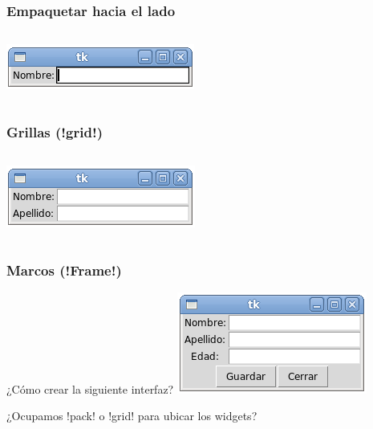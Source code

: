 \documentclass[12pt]{beamer}
\begin{document}
  \begin{frame}
    \label{pack-left}
    \frametitle{Empaquetar hacia el lado}
    \begin{columns}[B]
        \footnotesize
        
        \vspace{24ex}
        \includegraphics[width=\textwidth]{programas/tkinter/capturas/11.png}
    \end{columns}
  \end{frame}

  \begin{frame}
    \label{grillas}
    \frametitle{Grillas (\li!grid!)}
    \begin{columns}[B]
        \footnotesize
        
        \vspace{24ex}
        \includegraphics[width=\textwidth]{programas/tkinter/capturas/12.png}
    \end{columns}
  \end{frame}

  \begin{frame}
    \label{ejemplo-marcos}
    \frametitle{Marcos (\li!Frame!)}
    ¿Cómo crear la siguiente interfaz?
    \includegraphics[width=\textwidth]{programas/tkinter/capturas/13.png}

    ¿Ocupamos \li!pack! o \li!grid! para ubicar los widgets?
  \end{frame}
\end{document}
